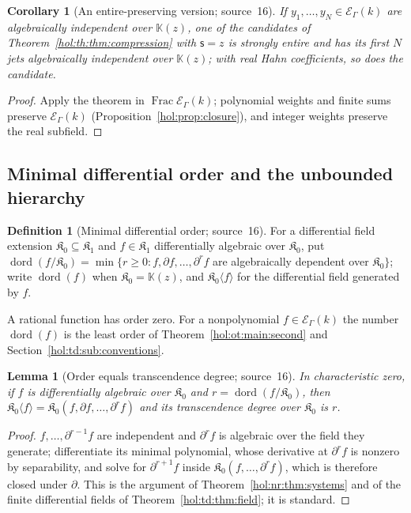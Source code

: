 \documentclass[11pt]{article}
\numberwithin{equation}{section}
\newtheorem{lemma}[theorem]{Lemma}
\newtheorem{corollary}[theorem]{Corollary}
\theoremstyle{definition}
\newtheorem{definition}[theorem]{Definition}
\theoremstyle{remark}
\newcommand{\KK}{\mathbb K}
\newcommand{\EK}{\mathcal E_\Gamma(k)}
\newcommand{\FE}{\operatorname{Frac}\EK}
\begin{document}
\begin{corollary}[An entire-preserving version; source~16]
\label{hol:th:cor:entirecompression}
If $y_1,\ldots,y_N\in\EK$ are algebraically independent over $\KK(z)$, one of
the candidates of Theorem~\ref{hol:th:thm:compression} with $\mathsf s=z$ is
strongly entire and has its first $N$ jets algebraically independent over
$\KK(z)$; with real Hahn coefficients, so does the candidate.
\end{corollary}

\begin{proof}
Apply the theorem in $\FE$; polynomial weights and finite sums preserve
$\EK$ (Proposition~\ref{hol:prop:closure}), and integer weights preserve the
real subfield.
\end{proof}

\subsection{Minimal differential order and the unbounded hierarchy}
\label{hol:th:sub:order}

\begin{definition}[Minimal differential order; source~16]\label{hol:th:def:dord}
For a differential field extension $\mathfrak K_0\subseteq\mathfrak K_1$ and
$f\in\mathfrak K_1$ differentially algebraic over $\mathfrak K_0$, put
$\operatorname{dord}(f/\mathfrak K_0)=\min\{r\ge0:f,\partial f,\ldots,
\partial^rf$ are algebraically dependent over $\mathfrak K_0\}$; write
$\operatorname{dord}(f)$ when $\mathfrak K_0=\KK(z)$, and
$\mathfrak K_0\langle f\rangle$ for the differential field generated by $f$.
\end{definition}

A rational function has order zero. For a nonpolynomial $f\in\EK$ the number
$\operatorname{dord}(f)$ is the least order of Theorem~\ref{hol:ot:main:second}
and Section~\ref{hol:td:sub:conventions}.

\begin{lemma}[Order equals transcendence degree; source~16]
\label{hol:th:lem:ordertrdeg}
In characteristic zero, if $f$ is differentially algebraic over
$\mathfrak K_0$ and $r=\operatorname{dord}(f/\mathfrak K_0)$, then
$\mathfrak K_0\langle f\rangle=\mathfrak K_0(f,\partial f,\ldots,\partial^rf)$
and its transcendence degree over $\mathfrak K_0$ is $r$.
\end{lemma}

\begin{proof}
$f,\ldots,\partial^{r-1}f$ are independent and $\partial^rf$ is algebraic over
the field they generate; differentiate its minimal polynomial, whose
derivative at $\partial^rf$ is nonzero by separability, and solve for
$\partial^{r+1}f$ inside $\mathfrak K_0(f,\ldots,\partial^rf)$, which is
therefore closed under $\partial$. This is the argument of
Theorem~\ref{hol:nr:thm:systems} and of the finite differential fields of
Theorem~\ref{hol:td:thm:field}; it is standard.
\end{proof}
\end{document}
